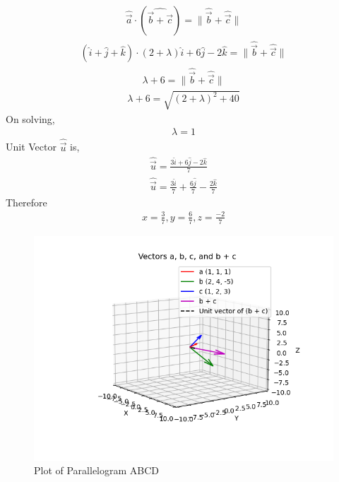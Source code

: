 \documentclass[journal]{IEEEtran}
\begin{document}
\begin{align}
    \hat{\vec{a}} \cdot (\hat{\vec{b}+\vec{c}})=\|\hat{\vec{b}}+\hat{\vec{c}}\|
\end{align}
\begin{align}
    (\hat{i}+\hat{j}+\hat{k}) \cdot (2+\lambda)\hat{i}+6\hat{j}-2\hat{k}=\|\hat{\vec{b}}+\hat{\vec{c}}\|
\end{align}
\begin{align}
    \lambda+6=\|\hat{\vec{b}}+\hat{\vec{c}}\|
\end{align}
\begin{align}
    \lambda+6=\sqrt{(2+\lambda)^2+40}
\end{align}
On solving,
\begin{align}
    \lambda=1
\end{align}
Unit Vector $\hat{\vec{u}}$ is,
\begin{align}
    \hat{\vec{u}}=\frac{3\hat{i}+6\hat{j}-2\hat{k}}{7}\\
     \hat{\vec{u}}=\frac{3\hat{i}}{7}+\frac{6\hat{j}}{7}-\frac{2\hat{k}}{7}
\end{align}
Therefore
\begin{align}
    x=\frac{3}{7},y=\frac{6}{7},z=\frac{-2}{7}
\end{align}
\begin{figure}[h!]
   \centering
   \includegraphics[width=\linewidth]{figs/Figure_1.png}
   \caption{Plot of Parallelogram ABCD}
   \label{stemplot}
\end{figure}
\end{document}

